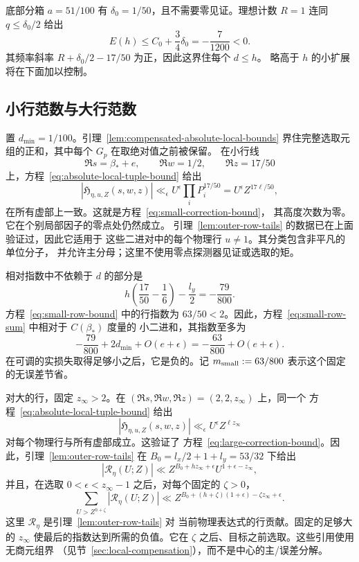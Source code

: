 底部分箱 \(a=51/100\) 有 \(\delta_0=1/50\)，且不需要零见证。理想计数
\(R=1\) 连同 \(q\le\delta_0/2\) 给出
\begin{equation}\label{eq:floor-bound}
 E(h)\le C_0+\frac34\delta_0=-\frac7{1200}<0.
\end{equation}
其频率斜率 \(R+\delta_0/2-17/50\) 为正，因此这界住每个 \(d\le h\)。
略高于 \(h\) 的小扩展将在下面加以控制。

\subsection{小行范数与大行范数}\label{sec:tails}

置 \(d_{\min}=1/100\)。引理~\ref{lem:compensated-absolute-local-bounds}
界住完整选取元组的正和，其中每个 \(G_p\) 在取绝对值之前被保留。
在小行线
\[
 \Re s=\beta_*+e,\qquad \Re w=1/2,\qquad \Re z=17/50
\]
上，方程~\eqref{eq:absolute-local-tuple-bound} 给出
\[
 |\mathfrak H_{\eta,u,Z}(s,w,z)|
 \ll_\epsilon U^\epsilon\prod_iP_i^{17/50}
 =U^\epsilon Z^{17\ell/50},
\]
在所有虚部上一致。这就是方程~\eqref{eq:small-correction-bound}，
其高度次数为零。它在个别局部因子的零点处仍然成立。
引理~\ref{lem:outer-row-tails} 的数据已在上面验证过，因此它适用于
这些二进对中的每个物理行 \(u\ne1\)。其分类包含非平凡的单位分子，
并允许主分母；这里不使用零点探测器见证或选取的矩。

相对指数中不依赖于 \(d\) 的部分是
\begin{equation}\label{eq:small-frequency-margin}
 h\left(\frac{17}{50}-\frac16\right)-\frac{l_y}{2}
 =-\frac{79}{800}.
\end{equation}
方程~\eqref{eq:small-row-bound} 中的行指数为
\(63/50<2\)。因此，方程~\eqref{eq:small-row-sum} 中相对于 \(C(\beta_*)\) 度量的
小二进和，其指数至多为
\[
 -\frac{79}{800}+2d_{\min}+O(e+\epsilon)
 =-\frac{63}{800}+O(e+\epsilon).
\]
在可调的实损失取得足够小之后，它是负的。记
\(m_{\rm small}:=63/800\) 表示这个固定的无误差节省。

对大的行，固定 \(z_\infty>2\)。在
\((\Re s,\Re w,\Re z)=(2,2,z_\infty)\) 上，同一个
方程~\eqref{eq:absolute-local-tuple-bound} 给出
\[
 |\mathfrak H_{\eta,u,Z}(s,w,z)|
 \ll_\epsilon U^\epsilon Z^{\ell z_\infty}
\]
对每个物理行与所有虚部成立。这验证了
方程~\eqref{eq:large-correction-bound}。因此，引理~\ref{lem:outer-row-tails}
在 \(B_0=l_x/2+1+l_y=53/32\) 下给出
\[
 |\mathscr R_\eta(U;Z)|
 \ll Z^{B_0+hz_\infty+\epsilon}U^{1+\epsilon-z_\infty},
\]
并且，在选取 \(0<\epsilon<z_\infty-1\) 之后，对每个固定的 \(\zeta>0\)，
\[
 \sum_{U>Z^{h+\zeta}}|\mathscr R_\eta(U;Z)|
 \ll
 Z^{B_0+(h+\zeta)(1+\epsilon)-\zeta z_\infty+\epsilon}.
\]
这里 \(\mathscr R_\eta\) 是引理~\ref{lem:outer-row-tails} 对
当前物理表达式的行贡献。固定的足够大的 \(z_\infty\)
使最后的指数达到所需的负值。它在
\(\zeta\) 之后、目标之前选取。这些引用使用无商元组界
（见节~\ref{sec:local-compensation}），而不是中心的主/误差分解。


